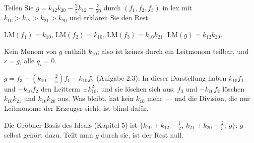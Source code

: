 \begin{aufgabe}
Teilen Sie $g = k_{12}k_{20} - \tfrac25k_{12} + \tfrac{3}{50}$ durch $(f_1, f_2, f_3)$ in lex mit $k_{10} > k_{12} > k_{21} > k_{20}$ und erklären Sie den Rest.

\loesung
{}
$\mathrm{LM}(f_1) = k_{10}$, $\mathrm{LM}(f_2) = k_{10}$, $\mathrm{LM}(f_3) = k_{10}k_{21}$. $\mathrm{LM}(g) = k_{12}k_{20}$.

Kein Monom von $g$ enthält $k_{10}$; also ist keines durch ein Leitmonom teilbar, und $r = g$, alle $q_i = 0$.

$g = f_3 + (k_{10} - \tfrac25)f_1 - k_{10}f_2$ (Aufgabe 2.3): In dieser Darstellung haben $k_{10}f_1$ und $-k_{10}f_2$ den Leitterm $\pm k_{10}^{2}$, und sie löschen sich aus; $f_3$ und $-k_{10}f_2$ löschen $k_{10}k_{21}$ und $k_{10}k_{20}$ aus. Was bleibt, hat kein $k_{10}$ mehr --- und die Division, die nur Leitmonome der Erzeuger sieht, ist blind dafür.

Die Gröbner-Basis des Ideals (Kapitel 5) ist $\{k_{10} + k_{12} - \tfrac12,\ k_{21} + k_{20} - \tfrac25,\ g\}$: $g$ selbst gehört dazu. Teilt man $g$ durch sie, ist der Rest null. \checkmark

\begin{center}
\begin{minipage}{0.88\textwidth}
\end{minipage}
\end{center}
\end{aufgabe}

